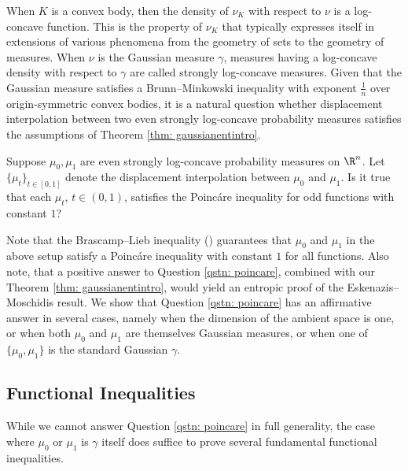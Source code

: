 When $K$ is a convex body, then the density of $\nu_{K}$ with respect to $\nu$ is a log-concave function. This is the property of $\nu_{K}$ that typically expresses itself in extensions of various phenomena from the geometry of sets to the geometry of measures. When $\nu$ is the Gaussian measure $\gamma$, measures having a log-concave density with respect to $\gamma$ are called strongly log-concave measures. Given that the Gaussian measure satisfies a Brunn--Minkowski inequality with exponent $\frac{1}{n}$ over origin-symmetric convex bodies, it is a natural question whether displacement interpolation between two even strongly log-concave probability measures satisfies the assumptions of Theorem \ref{thm: gaussianentintro}.
\begin{qstn} \label{qstn: poincare}
    Suppose $\mu_{0}, \mu_{1}$ are even strongly log-concave probability measures on $\R^n$. Let $\{ \mu_{t} \}_{t \in [0,1]}$ denote the displacement interpolation between $\mu_{0}$ and $\mu_{1}$. Is it true that each $\mu_{t}$, $t\in (0,1)$, satisfies the Poinc\'are inequality for odd functions with constant $1$?
\end{qstn}

Note that the Brascamp--Lieb inequality (\cite[Theorem 4.1]{BrascampLieb76}) guarantees that $\mu_{0}$ and $\mu_{1}$ in the above setup satisfy a Poinc\'are inequality with constant $1$ for all functions. Also note, that a positive answer to Question \ref{qstn: poincare}, combined with our Theorem \ref{thm: gaussianentintro}, would yield an entropic proof of the Eskenazis--Moschidis result. 
We show that Question \ref{qstn: poincare} has an affirmative answer in several cases, namely when the dimension of the ambient space is one, or when both $\mu_{0}$ and $\mu_{1}$ are themselves Gaussian measures, or when one of $\{ \mu_{0}, \mu_{1} \}$ is the standard Gaussian $\gamma$. 


\subsection{Functional Inequalities}
While we cannot answer Question \ref{qstn: poincare} in full generality, the case where $\mu_0$ or $\mu_1$ is $\gamma$ itself does suffice to prove several fundamental functional inequalities.

